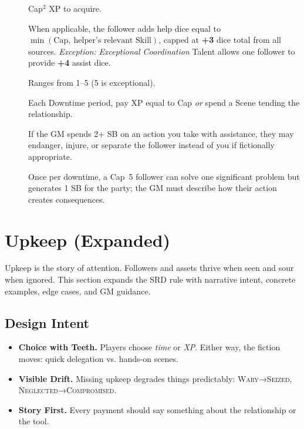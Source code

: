 \begin{description}
\item[] Cap$^{2}$ XP to acquire. 
\item[] When applicable, the follower adds help dice equal to $\min(\text{Cap},\ \text{helper's relevant Skill})$, capped at \textbf{+3} dice total from all sources. \emph{Exception:} \textit{Exceptional Coordination} Talent allows one follower to provide \textbf{+4} assist dice. 
\item[] Ranges from 1--5 (5 is exceptional). 
\item[] Each Downtime period, pay XP equal to Cap \emph{or} spend a Scene tending the relationship. 
\item[] If the GM spends 2+ SB on an action you take with assistance, they may endanger, injure, or separate the follower instead of you if fictionally appropriate. 
\item[] Once per downtime, a Cap~5 follower can solve one significant problem but generates 1 SB for the party; the GM must describe how their action creates consequences. 
\end{description}


\section{Upkeep (Expanded)}\label{sec:upkeep-expanded}

Upkeep is the story of attention. Followers and assets thrive when seen and sour when ignored. This section expands the SRD rule with narrative intent, concrete examples, edge cases, and GM guidance.

\subsection{Design Intent}\label{subsec:upkeep-intent}
\begin{itemize}
\item \textbf{Choice with Teeth.} Players choose \emph{time} or \emph{XP}. Either way, the fiction moves: quick delegation vs. hands-on scenes.
\item \textbf{Visible Drift.} Missing upkeep degrades things predictably: \textsc{Wary}→\textsc{Seized}, \textsc{Neglected}→\textsc{Compromised}.
\item \textbf{Story First.} Every payment should say something about the relationship or the tool.
\end{itemize}

